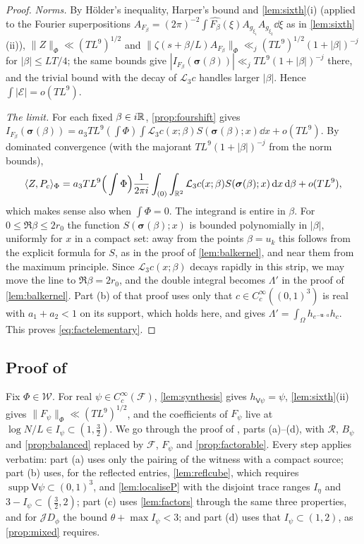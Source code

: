 \documentclass[11pt,colorlinks]{charlie}
\newcommand{\Om}{\Omega}
\newcommand{\ip}[2]{\langle #1,#2\rangle}
\begin{document}
\begin{proof}
\emph{Norms.} By H\"older's inequality, Harper's bound and \cref{lem:sixth}(i) (applied to the Fourier superpositions $A_{F_\beta}=(2\pi)^{-2}\int\widehat{F_\beta}(\xi)A_{g_{\xi_1}}A_{g_{\xi_2}}\dd\xi$ as in \cref{lem:sixth}(ii)), $\|Z\|_\Phi\ll(TL^9)^{1/2}$ and $\|\zeta(s+\beta/L)A_{F_\beta}\|_\Phi\ll_j(TL^9)^{1/2}(1+|\beta|)^{-j}$ for $|\beta|\le LT/4$; the same bounds give $|I_{F_\beta}(\boldsymbol\sigma(\beta))|\ll_j TL^9(1+|\beta|)^{-j}$ there, and the trivial bound with the decay of $\mathcal L_3c$ handles larger $|\beta|$. Hence $\int|\mathcal E|=o(TL^9)$.

\emph{The limit.} For each fixed $\beta\in i\mathbb{R}$, \cref{prop:fourshift} gives $I_{F_\beta}(\boldsymbol\sigma(\beta))=a_3TL^9(\int\Phi)\int\mathcal L_3c(x;\beta)S(\boldsymbol\sigma(\beta);x)\dd x+o(TL^9)$. By dominated convergence (with the majorant $TL^9(1+|\beta|)^{-j}$ from the norm bounds),
\[
 \ip Z{P_c}_\Phi=a_3TL^9\Big(\int\Phi\Big)\frac1{2\pi i}\int_{(0)}\int_{\R^2}\mathcal L_3c(x;\beta)S(\boldsymbol\sigma(\beta);x)\dd x\dd\beta+o(TL^9),
\]
which makes sense also when $\int\Phi=0$.
The integrand is entire in $\beta$. For $0\le\Re\beta\le2r_0$ the function $S(\boldsymbol\sigma(\beta);x)$ is bounded polynomially in $|\beta|$, uniformly for $x$ in a compact set: away from the points $\beta=u_k$ this follows from the explicit formula for $S$, as in the proof of \cref{lem:balkernel}, and near them from the maximum principle. Since $\mathcal L_3c(x;\beta)$ decays rapidly in this strip, we may move the line to $\Re\beta=2r_0$, and the double integral becomes $\Lambda'$ in the proof of \cref{lem:balkernel}. Part (b) of that proof uses only that $c\in C_c^\infty((0,1)^3)$ is real with $a_1+a_2<1$ on its support, which holds here, and gives $\Lambda'=\int_\Om h_{e^{-\boldsymbol u\cdot a}}h_c$. This proves \eqref{eq:factelementary}.
\end{proof}

\subsection{Proof of }
Fix $\Phi\in\mathcal W$. For real $\psi\in C_c^\infty(\mathcal F)$, \cref{lem:synthesis} gives $h_{\mathsf V\psi}=\psi$, \cref{lem:sixth}(ii) gives $\|F_\psi\|_\Phi\ll(TL^9)^{1/2}$, and the coefficients of $F_\psi$ live at $\log N/L\in I_\psi\subset(1,\frac32)$. We go through the proof of , parts (a)--(d), with $\mathcal R$, $B_\psi$ and \cref{prop:balanced} replaced by $\mathcal F$, $F_\psi$ and \cref{prop:factorable}. Every step applies verbatim: part (a) uses only the pairing of the witness with a compact source; part (b) uses, for the reflected entries, \cref{lem:reflcube}, which requires $\operatorname{supp}\mathsf V\psi\subset(0,1)^3$, and \cref{lem:localiseP} with the disjoint trace ranges $I_\eta$ and $3-I_\psi\subset(\frac32,2)$; part (c) uses \cref{lem:factors} through the same three properties, and for $\mathcal JD_\phi$ the bound $\theta+\max I_\psi<3$; and part (d) uses that $I_\psi\subset(1,2)$, as \cref{prop:mixed} requires.
\end{document}
